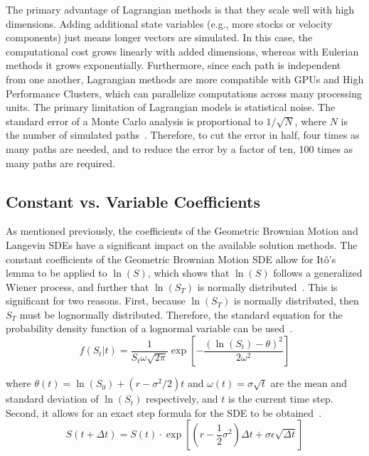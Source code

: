 \documentclass[12pt, onecolumn, journal]{IEEEtran}
\begin{document}
The primary advantage of Lagrangian methods is that they scale well with high dimensions. Adding additional state variables (e.g., more stocks or velocity components) just means longer vectors are simulated. In this case, the computational cost grows linearly with added dimensions, whereas with Eulerian methods it grows exponentially. Furthermore, since each path is independent from one another, Lagrangian methods are more compatible with GPUs and High Performance Clusters, which can parallelize computations across many processing units. The primary limitation of Lagrangian models is statistical noise. The standard error of a Monte Carlo analysis is proportional to $1/\sqrt{N}$, where $N$ is the number of simulated paths~\cite{Hull2022}. Therefore, to cut the error in half, four times as many paths are needed, and to reduce the error by a factor of ten, 100 times as many paths are required.

\subsection{Constant vs. Variable Coefficients}
As mentioned previously, the coefficients of the Geometric Brownian Motion and Langevin SDEs have a significant impact on the available solution methods. The constant coefficients of the Geometric Brownian Motion SDE allow for It\^{o}'s lemma to be applied to $\ln(S)$, which shows that $\ln(S)$ follows a generalized Wiener process, and further that $\ln(S_T)$ is normally distributed~\cite{Hull2022}. This is significant for two reasons. First, because $\ln(S_T)$ is normally distributed, then $S_T$ must be lognormally distributed. Therefore, the standard equation for the probability density function of a lognormal variable can be used~\cite{Montgomery2011}.
\begin{equation}
    f(S_t | t) = \frac{1}{S_t \omega \sqrt{2 \pi}} \exp\left[{- \frac{(\ln(S_t) - \theta)^2}{2 \omega^2}}\right]
    \label{eq:analytical_logpdf}
\end{equation}

where $\theta(t) = \ln(S_0) + (r - \sigma^2/2)t$ and $\omega(t) = \sigma \sqrt{t}$ are the mean and standard deviation of $\ln(S_t)$ respectively, and $t$ is the current time step. Second, it allows for an exact step formula for the SDE to be obtained~\cite{Hull2022}.
\begin{equation}
    S(t + \Delta t) = S(t) \cdot \exp\left[\left(r - \frac{1}{2}\sigma^2\right)\Delta t + \sigma\epsilon\sqrt{\Delta t}\right]
    \label{eq:exact_step}
\end{equation}
\end{document}
